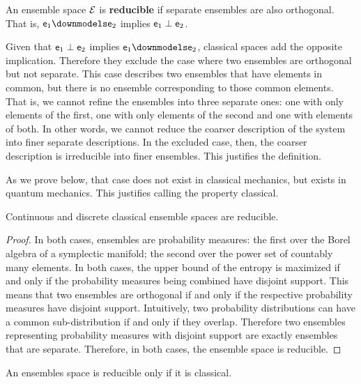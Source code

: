 \begin{defn}
	An ensemble space $\mathcal{E}$ is \textbf{reducible} if separate ensembles are also orthogonal. That is, $\ens_1 \separate \ens_2$ implies $\mathsf{e}_1 \perp \mathsf{e}_2$.
\end{defn}

\begin{justification}
	Given that $\mathsf{e}_1 \perp \mathsf{e}_2$ implies $\ens_1 \separate \ens_2$, classical spaces add the opposite implication. Therefore they exclude the case where two ensembles are orthogonal but not separate. This case describes two ensembles that have elements in common, but there is no ensemble corresponding to those common elements. That is, we cannot refine the ensembles into three separate ones: one with only elements of the first, one with only elements of the second and one with elements of both. In other words, we cannot reduce the coarser description of the system into finer separate descriptions. In the excluded case, then, the coarser description is irreducible into finer ensembles. This justifies the definition.
	
	As we prove below, that case does not exist in classical mechanics, but exists in quantum mechanics. This justifies calling the property classical.
\end{justification}

\begin{prop}
	Continuous and discrete classical ensemble spaces are reducible.
\end{prop}

\begin{proof}
	In both cases, ensembles are probability measures: the first over the Borel algebra of a symplectic manifold; the second over the power set of countably many elements. In both cases, the upper bound of the entropy is maximized if and only if the probability measures being combined have disjoint support. This means that two ensembles are orthogonal if and only if the respective probability measures have disjoint support. Intuitively, two probability distributions can have a common sub-distribution if and only if they overlap. Therefore two ensembles representing probability measures with disjoint support are exactly ensembles that are separate. Therefore, in both cases, the ensemble space is reducible.
\end{proof}

\begin{conj}
	An ensembles space is reducible only if it is classical.
\end{conj}


